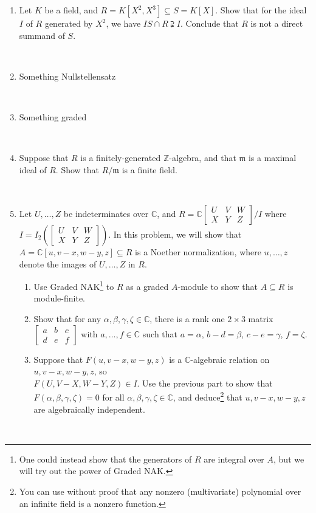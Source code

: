 \documentclass[12pt]{amsart}
\newcommand{\Z}{\mathbb{Z}}
\newcommand{\C}{\mathbb{C}}
\newcommand{\m}{\mathfrak{m}}
\begin{document}
	
\begin{enumerate}

\item Let $K$ be a field, and $R=K[X^2,X^3] \subseteq S=K[X]$. Show that for the ideal $I$ of $R$ generated by $X^2$, we have $I S \cap R \supsetneqq I$. Conclude that $R$ is not a direct summand of $S$.


\

\item Something Nullstellensatz


\

\item Something graded

\


\item Suppose that $R$ is a finitely-generated $\Z$-algebra, and that $\m$ is a maximal ideal of $R$. Show that $R/\m$ is a finite field.

\


\item Let $U,\dots,Z$ be indeterminates over $\C$, and $\displaystyle R= \C \begin{bmatrix} U & V & W \\ X & Y & Z \end{bmatrix} \Big/ I$ where $I=I_2\left(\begin{bmatrix} U & V & W \\ X & Y & Z \end{bmatrix}\right)$. In this problem, we will show that $A=\C[u, v-x, w-y, z] \subseteq R$ is a Noether normalization, where $u,\dots,z$ denote the images of $U,\dots,Z$ in $R$.
\begin{enumerate}
\item Use Graded NAK\footnote{One could instead show that the generators of $R$ are integral over $A$, but we will try out the power of Graded NAK.} to $R$ as a graded $A$-module to show that $A\subseteq R$ is module-finite.
\item Show that for any $\alpha,\beta,\gamma,\zeta \in \C$, there is a rank one $2\times 3$ matrix $\begin{bmatrix}  a & b & c \\ d & e & f\end{bmatrix}$ with $a,\dots,f\in \C$ such that $a =\alpha$, $b-d = \beta$, $c-e= \gamma$, $f=\zeta$.
\item Suppose that $F(u,v-x,w-y,z)$ is a $\C$-algebraic relation on $u,v-x,w-y,z$, so \\ ${F(U,V-X,W-Y,Z)\in I}$. Use the previous part to show that $F(\alpha,\beta,\gamma,\zeta)=0$ for all $\alpha,\beta,\gamma,\zeta \in \C$, and deduce\footnote{You can use without proof that any nonzero (multivariate) polynomial over an infinite field is a nonzero function.} that $u,v-x,w-y,z$ are algebraically independent.
\end{enumerate}


\

\end{enumerate}
\end{document}
